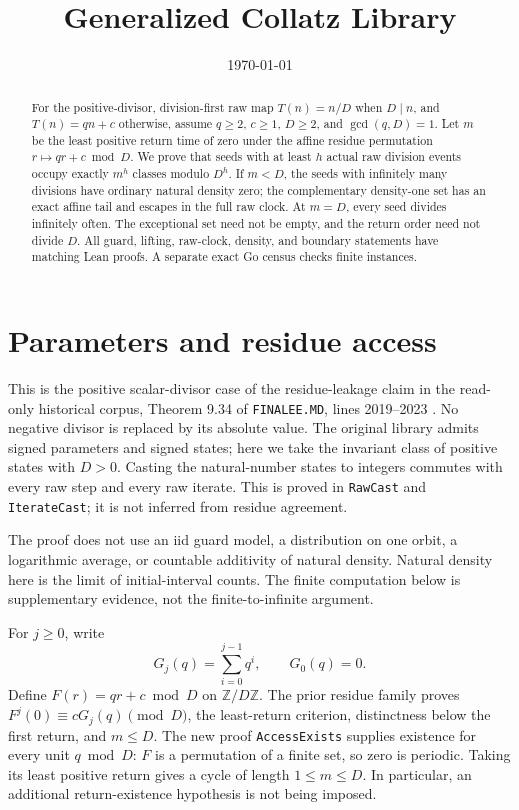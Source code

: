 \documentclass[11pt,letterpaper]{article}
\title{Generalized Collatz Library}
\author{}
\date{\today}
\newcommand{\Z}{\mathbb{Z}}
\begin{document}
\maketitle

\begin{abstract}
For the positive-divisor, division-first raw map
\(T(n)=n/D\) when \(D\mid n\), and \(T(n)=qn+c\) otherwise,
assume \(q\ge2\), \(c\ge1\), \(D\ge2\), and \(\gcd(q,D)=1\).
Let \(m\) be the least positive return time of zero under the affine
residue permutation \(r\mapsto qr+c\bmod D\).
We prove that seeds with at least \(h\) actual raw division events
occupy exactly \(m^h\) classes modulo \(D^h\).
If \(m<D\), the seeds with infinitely many divisions have ordinary natural
density zero; the complementary density-one set has an exact affine tail
and escapes in the full raw clock.
At \(m=D\), every seed divides infinitely often.
The exceptional set need not be empty, and the return order need not divide \(D\).
All guard, lifting, raw-clock, density, and boundary statements have matching
Lean proofs. A separate exact Go census checks finite instances.
\end{abstract}

\section{Parameters and residue access}

This is the positive scalar-divisor case of the residue-leakage claim in
the read-only historical corpus, Theorem 9.34 of
\texttt{FINALEE.MD}, lines 2019--2023 \cite{Corpus26}.
No negative divisor is replaced by its absolute value.
The original library admits signed parameters and signed states; here we
take the invariant class of positive states with \(D>0\).
Casting the natural-number states to integers commutes with every raw
step and every raw iterate. This is proved in
\texttt{RawCast} and \texttt{IterateCast}; it is not inferred from residue agreement.

The proof does not use an iid guard model, a distribution on one orbit,
a logarithmic average, or countable additivity of natural density.
Natural density here is the limit of initial-interval counts.
The finite computation below is supplementary evidence, not the
finite-to-infinite argument.

For \(j\ge0\), write
\[
G_j(q)=\sum_{i=0}^{j-1}q^i,\qquad G_0(q)=0.
\]
Define \(F(r)=qr+c\bmod D\) on \(\Z/D\Z\).
The prior residue family proves
\(F^j(0)\equiv cG_j(q)\pmod D\), the least-return criterion,
distinctness below the first return, and \(m\le D\).
The new proof \texttt{AccessExists} supplies existence for every unit \(q\bmod D\):
\(F\) is a permutation of a finite set, so zero is periodic.
Taking its least positive return gives a cycle of length \(1\le m\le D\).
In particular, an additional return-existence hypothesis is not being imposed.
\end{document}
